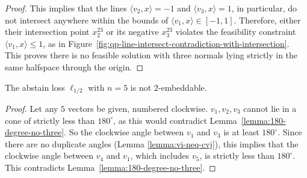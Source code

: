 \documentclass[final]{colt2020} %
\newcommand{\inprod}[2]{\langle #1, #2 \rangle}%
\begin{document}
\begin{proof}
	This implies that the lines $\inprod{v_2}{x}=-1$ and $\inprod{v_3}{x}=1$, in particular, do not intersect anywhere within the bounds of $\inprod{v_1}{x} \in [-1,1]$.
	Therefore, either their intersection point $x^{23}_2$ or its negative $x^{23}_3$ violates the feasibility constraint $\inprod{v_1}{x} \leq 1$, as in Figure~\ref{fig:qp-line-intersect-contradiction-with-intersection}.
	This proves there is no feasible solution with three normals lying strictly in the same halfspace through the origin.
\end{proof}

\begin{proposition}
	The abstain loss $\ell_{1/2}$ with $n=5$ is not $2$-embeddable.
\end{proposition}
\begin{proof}
	Let any $5$ vectors be given, numbered clockwise.
	$v_1,v_2,v_3$ cannot lie in a cone of strictly less than $180^{\circ}$, as this would contradict Lemma~\ref{lemma:180-degree-no-three}.
	So the clockwise angle between $v_1$ and $v_3$ is at least $180^{\circ}$.
	Since there are no duplicate angles (Lemma \ref{lemma:vi-neq-cvj}), this implies that the clockwise angle between $v_4$ and $v_1$, which includes $v_5$, is strictly less than $180^{\circ}$.
	This contradicts Lemma~\ref{lemma:180-degree-no-three}.
\end{proof}
\end{document}
